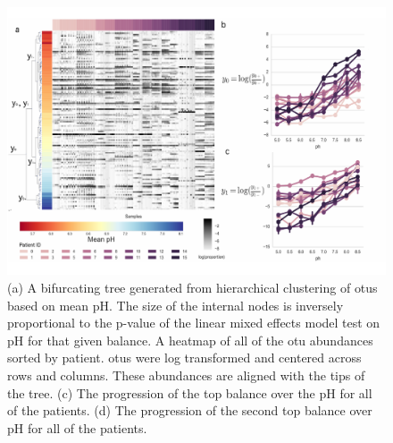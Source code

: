   \begin{figure}[H]
        \centering
        \includegraphics[width=1\textwidth]{ch3/Figure3.pdf}
        \caption[The application of balances on a cystic fibrosis dataset to identify
          microbial partitioning with respect to pH.]
        {(a) A bifurcating tree generated from hierarchical clustering of \gls{otu}s based on mean pH.   The size of the internal nodes is inversely proportional to the p-value of the linear mixed effects model test on pH for that given balance.  A heatmap of all of the \gls{otu} abundances sorted by patient. \gls{otu}s were log transformed and centered across rows and columns. These abundances are aligned with the tips of the tree.  (c) The progression of the top balance over the pH for all of the patients.  (d) The progression of the second top balance over pH for all of the patients.}
        \label{figc3}
 \end{figure}
